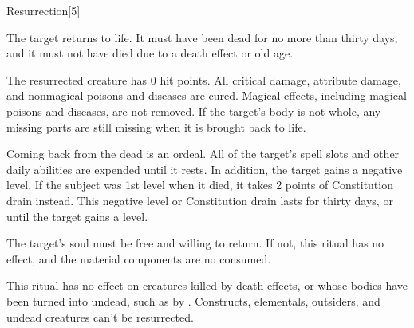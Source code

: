 \begin{spellsection}[Lesser]{Resurrection}[5]
    \begin{spellheader}
    \end{spellheader}
    \begin{spellcontent}
        \begin{spelltargetinginfo}
        \end{spelltargetinginfo}
        \begin{spelleffects}

            \spelleffect The target returns to life. It must have been dead for no more than thirty days, and it must not have died due to a death effect or old age.

            The resurrected creature has 0 hit points. All critical damage, attribute damage, and nonmagical poisons and diseases are cured. Magical effects, including magical poisons and diseases, are not removed. If the target's body is not whole, any missing parts are still missing when it is brought back to life.

            \par Coming back from the dead is an ordeal. All of the target's spell slots and other daily abilities are expended until it rests. In addition, the target gains a negative level. If the subject was 1st level when it died, it takes 2 points of Constitution drain instead. This negative level or Constitution drain lasts for thirty days, or until the target gains a level.
        \end{spelleffects}
    \end{spellcontent}
    \begin{spellfooter}
        \spellnotes The target's soul must be free and willing to return. If not, this ritual has no effect, and the material components are no consumed.

        This ritual has no effect on creatures killed by death effects, or whose bodies have been turned into undead, such as by . Constructs, elementals, outsiders, and undead creatures can't be resurrected.
    \end{spellfooter}
\end{spellsection}

